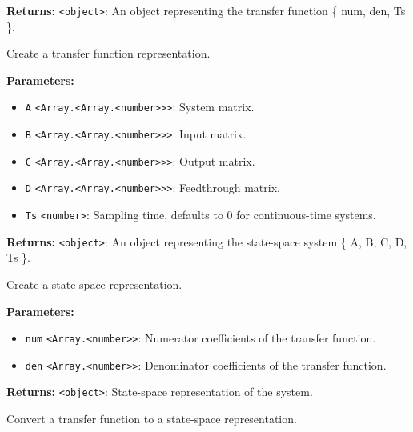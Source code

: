 \documentclass[12pt,a4paper]{article}
\begin{document}
\noindent \textbf{Returns:} \texttt{<object>}: An object representing the transfer function \{ num, den, Ts \}.

\noindent Create a transfer function representation.

\vspace{5mm}
\noindent {}


\noindent \textbf{Parameters:}
\begin{itemize}
  \item \texttt{A} \texttt{<Array.<Array.<number>>>}: System matrix.
  \item \texttt{B} \texttt{<Array.<Array.<number>>>}: Input matrix.
  \item \texttt{C} \texttt{<Array.<Array.<number>>>}: Output matrix.
  \item \texttt{D} \texttt{<Array.<Array.<number>>>}: Feedthrough matrix.
  \item \texttt{Ts} \texttt{<number>}: Sampling time, defaults to 0 for continuous-time systems.
\end{itemize}

\noindent \textbf{Returns:} \texttt{<object>}: An object representing the state-space system \{ A, B, C, D, Ts \}.

\noindent Create a state-space representation.

\vspace{5mm}
\noindent {}


\noindent \textbf{Parameters:}
\begin{itemize}
  \item \texttt{num} \texttt{<Array.<number>>}: Numerator coefficients of the transfer function.
  \item \texttt{den} \texttt{<Array.<number>>}: Denominator coefficients of the transfer function.
\end{itemize}

\noindent \textbf{Returns:} \texttt{<object>}: State-space representation of the system.

\noindent Convert a transfer function to a state-space representation.

\vspace{5mm}
\noindent {}
\end{document}
